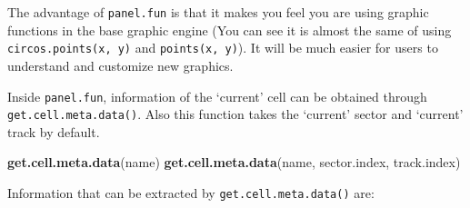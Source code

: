 \documentclass[]{book}
\newenvironment{Shaded}{\begin{snugshade}}{\end{snugshade}}
\newcommand{\KeywordTok}[1]{\textcolor[rgb]{0.13,0.29,0.53}{\textbf{#1}}}
\newcommand{\NormalTok}[1]{#1}
\theoremstyle{definition}
\theoremstyle{definition}
\theoremstyle{remark}
\begin{document}
The advantage of \texttt{panel.fun} is that it makes you feel you are
using graphic functions in the base graphic engine (You can see it is
almost the same of using \texttt{circos.points(x,\ y)} and
\texttt{points(x,\ y)}). It will be much easier for users to understand
and customize new graphics.

Inside \texttt{panel.fun}, information of the `current' cell can be
obtained through \texttt{get.cell.meta.data()}. Also this function takes
the `current' sector and `current' track by default.

\begin{Shaded}
\begin{Highlighting}[]
\KeywordTok{get.cell.meta.data}\NormalTok{(name)}
\KeywordTok{get.cell.meta.data}\NormalTok{(name, sector.index, track.index)}
\end{Highlighting}
\end{Shaded}

Information that can be extracted by \texttt{get.cell.meta.data()} are:
\end{document}
